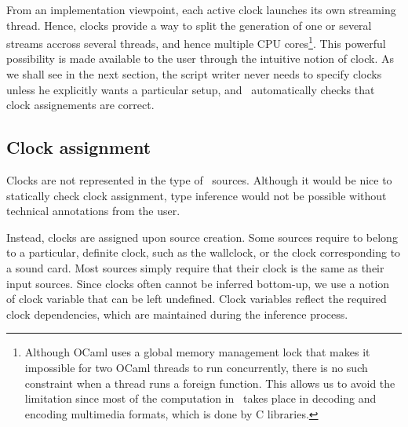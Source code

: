 From an implementation viewpoint, each active clock launches
its own streaming thread.
Hence, clocks provide a way to split the generation of one or
several streams accross several threads,
and hence multiple CPU cores\footnote{
  Although OCaml uses a global memory management lock that makes it
  impossible for two OCaml threads to run concurrently, there is no
  such constraint when a thread runs a foreign function.
  This allows us to avoid the limitation since
  most of the computation in \liquidsoap\ takes place in decoding
  and encoding multimedia formats, which is done by C libraries.
}.
This powerful possibility is made available to the user
through the intuitive notion of clock.
As we shall see in the next section,
the script writer never needs to specify clocks unless he
explicitly wants a particular setup,
and \liquidsoap\ automatically checks that clock assignements
are correct.


\subsection{Clock assignment}

Clocks are not represented in the type of \liquidsoap\ sources.
Although it would be nice to statically check clock assignment,
type inference would not be possible without technical annotations
from the user.

Instead, clocks are assigned upon source creation.
Some sources require to belong to a particular, definite clock,
such as the wallclock, or the clock corresponding to a sound card.
Most sources simply require that their clock is the same as their
input sources.
Since clocks often cannot be inferred bottom-up, we use a notion
of clock variable that can be left undefined.
Clock variables reflect the required clock dependencies,
which are maintained during the inference process.

